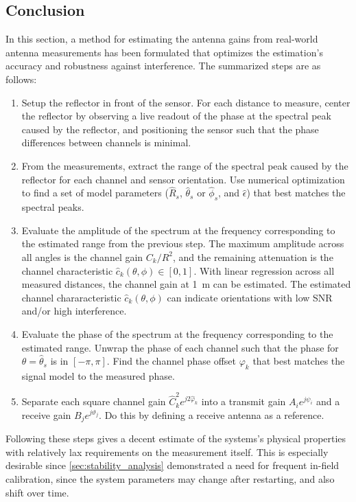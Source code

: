 \subsection{Conclusion}
In this section, a method for estimating the antenna gains from real-world antenna measurements has been formulated
that optimizes the estimation's accuracy and robustness against interference.
The summarized steps are as follows:
\begin{enumerate}
    \item Setup the reflector in front of the sensor.
          For each distance to measure, center the reflector by observing a live readout of the phase at the spectral peak caused by the reflector,
          and positioning the sensor such that the phase differences between channels is minimal.
    \item From the measurements, extract the range of the spectral peak caused by the reflector for each channel and sensor orientation.
          Use numerical optimization to find a set of model parameters ($\hat R_s$, $\hat \theta_s$ or $\hat \phi_s$, and $\hat\epsilon$)
          that best matches the spectral peaks.
    \item Evaluate the amplitude of the spectrum at the frequency corresponding to the estimated range from the previous step.
          The maximum amplitude across all angles is the channel gain $C_k / R^2$,
          and the remaining attenuation is the channel characteristic $\hat c_k(\theta,\phi) \in [0,1]$.
          With linear regression across all measured distances, the channel gain at \SI{1}{\m} can be estimated.
          The estimated channel chararacteristic $\hat c_k(\theta,\phi)$ can indicate orientations with low SNR and/or high interference.
    \item Evaluate the phase of the spectrum at the frequency corresponding to the estimated range.
          Unwrap the phase of each channel such that the phase for $\theta = \hat \theta_s$ is in $[-\pi,\pi]$.
          Find the channel phase offset $\varphi_k$ that best matches the signal model to the measured phase.
    \item Separate each square channel gain $\hat C_k^2e^{j2\hat \varphi_k}$ into a transmit gain $A_i e^{j\psi_i}$ and a receive gain $B_j e^{j\vartheta_j}$.
          Do this by defining a receive antenna as a reference.
\end{enumerate}

Following these steps gives a decent estimate of the systems's physical properties with relatively lax requirements on the measurement itself.
This is especially desirable since \autoref{sec:stability_analysis} demonstrated a need for frequent in-field calibration,
since the system parameters may change after restarting, and also shift over time. \\

